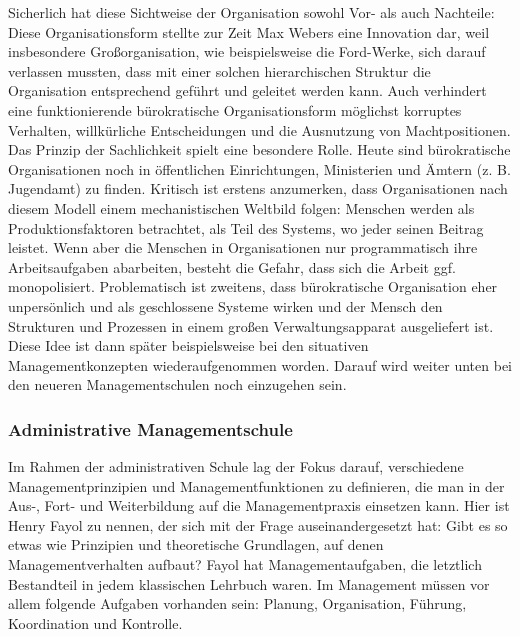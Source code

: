 \documentclass[
  letterpaper,
]{book}
\begin{document}
Sicherlich hat diese Sichtweise der Organisation sowohl Vor- als auch
Nachteile: Diese Organisationsform stellte zur Zeit Max Webers eine
Innovation dar, weil insbesondere Großorganisation, wie beispielsweise
die Ford-Werke, sich darauf verlassen mussten, dass mit einer solchen
hierarchischen Struktur die Organisation entsprechend geführt und
geleitet werden kann. Auch verhindert eine funktionierende bürokratische
Organisationsform möglichst korruptes Verhalten, willkürliche
Entscheidungen und die Ausnutzung von Machtpositionen. Das Prinzip der
Sachlichkeit spielt eine besondere Rolle. Heute sind bürokratische
Organisationen noch in öffentlichen Einrichtungen, Ministerien und
Ämtern (z. B. Jugendamt) zu finden. Kritisch ist erstens anzumerken,
dass Organisationen nach diesem Modell einem mechanistischen Weltbild
folgen: Menschen werden als Produktionsfaktoren betrachtet, als Teil des
Systems, wo jeder seinen Beitrag leistet. Wenn aber die Menschen in
Organisationen nur programmatisch ihre Arbeitsaufgaben abarbeiten,
besteht die Gefahr, dass sich die Arbeit ggf. monopolisiert.
Problematisch ist zweitens, dass bürokratische Organisation eher
unpersönlich und als geschlossene Systeme wirken und der Mensch den
Strukturen und Prozessen in einem großen Verwaltungsapparat ausgeliefert
ist. Diese Idee ist dann später beispielsweise bei den situativen
Managementkonzepten wiederaufgenommen worden. Darauf wird weiter unten
bei den neueren Managementschulen noch einzugehen sein.

\subsubsection{Administrative
Managementschule}\label{administrative-managementschule}

Im Rahmen der administrativen Schule lag der Fokus darauf, verschiedene
Managementprinzipien und Managementfunktionen zu definieren, die man in
der Aus-, Fort- und Weiterbildung auf die Managementpraxis einsetzen
kann. Hier ist Henry Fayol zu nennen, der sich mit der Frage
auseinandergesetzt hat: Gibt es so etwas wie Prinzipien und theoretische
Grundlagen, auf denen Managementverhalten aufbaut? Fayol hat
Managementaufgaben, die letztlich Bestandteil in jedem klassischen
Lehrbuch waren. Im Management müssen vor allem folgende Aufgaben
vorhanden sein: Planung, Organisation, Führung, Koordination und
Kontrolle.
\end{document}
